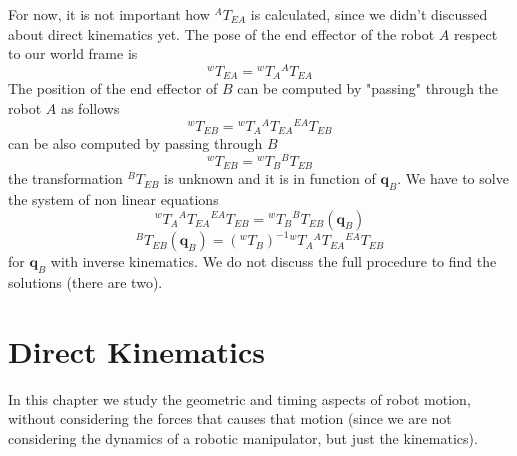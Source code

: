 \documentclass[10pt, letterpaper]{report}
\begin{document}
For now, it is not important how ${}^AT_{EA}$ is calculated, since we didn't discussed about direct kinematics yet. The pose of the end effector of the robot $A$ respect to our world frame is\begin{equation}
    {}^wT_{EA}={}^wT_{A}{}^AT_{EA}
\end{equation}
The position of the end effector of $B$ can be computed by "passing" through the robot $A$ as follows\begin{equation}
    {}^wT_{EB}={}^wT_{A}{}^AT_{EA}{}^{EA}T_{EB}
\end{equation}
can be also computed by passing through $B$\begin{equation}
    {}^wT_{EB}={}^wT_{B}{}^BT_{EB}
\end{equation}
the transformation ${}^BT_{EB}$ is unknown and it is in function of $\mathbf q_B$. We have to solve the system of non linear equations \begin{equation}
    {}^wT_{A}{}^AT_{EA}{}^{EA}T_{EB}={}^wT_{B}{}^BT_{EB}(\mathbf q_B)
\end{equation}
\begin{equation}
    {}^BT_{EB}(\mathbf q_B)=({}^wT_{B})^{-1}{}^wT_{A}{}^AT_{EA}{}^{EA}T_{EB}
\end{equation}
for $\mathbf q_B$ with inverse kinematics. We do not discuss the full procedure to find the solutions (there are two).
\chapter{Direct Kinematics}
In this chapter we study the geometric and timing aspects of robot motion, without considering the forces that causes that motion (since we are not considering the dynamics of a robotic manipulator, but just the kinematics). 
\end{document}
